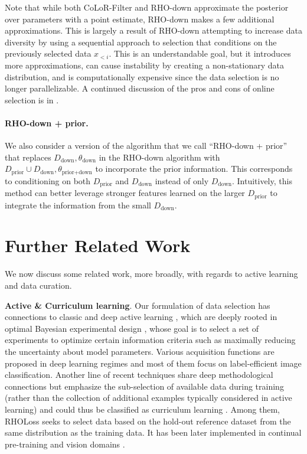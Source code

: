 \documentclass{article}
\newcommand{\Dprior}{D_{\text{prior}}}
\newcommand{\Ddown}{D_{\text{down}}}
\newcommand{\thetapriordown}{\theta_{\text{prior}+ \text{down}}}
\newcommand{\thetadown}{\theta_{\text{down}}}
\begin{document}
Note that while both CoLoR-Filter and RHO-down approximate the posterior over parameters with a point estimate, RHO-down makes a few additional approximations. This is largely a result of RHO-down attempting to increase data diversity by using a sequential approach to selection that conditions on the previously selected data $ x_{<i}$. This is an understandable goal, but it introduces more approximations, can cause instability by creating a non-stationary data distribution, and is computationally expensive since the data selection is no longer parallelizable.
A continued discussion of the pros and cons of online selection is in .

\paragraph{RHO-down + prior.} We also consider a version of the algorithm that we call ``RHO-down + prior'' that replaces $ \Ddown, \thetadown$ in the RHO-down algorithm with $ \Dprior \cup \Ddown , \thetapriordown$ to incorporate the prior information. This corresponds to conditioning on both $ \Dprior$ and $ \Ddown$ instead of only $ \Ddown$. Intuitively, this method can better leverage stronger features learned on the larger $ \Dprior$ to integrate the information from the small $ \Ddown$.

\section{Further Related Work}\label{sec:related}

We now discuss some related work, more broadly, with regards to active learning and data curation.

\textbf{Active \& Curriculum learning}. 
Our formulation of data selection has connections to classic and deep active learning \citep{houlsby2011bayesian, bickfordsmith2023prediction, kirsch2023a}, which are deeply rooted in optimal Bayesian experimental design \citep{lindley1956measure, rainforth2024modern}, whose goal is to select a set of experiments to optimize certain information criteria \citep{pukelsheim2006optimal} such as maximally reducing the uncertainty about model parameters. Various acquisition functions are proposed in deep learning regimes \citep{sener2018active, ash2019deep, ash2021gone} and most of them focus on label-efficient image classification.
Another line of recent techniques share deep methodological connections but emphasize the sub-selection of available data during training (rather than the collection of additional examples typically considered in active learning) and could thus be classified as curriculum learning \citep[e.g.][]{graves2017automated}. Among them, RHOLoss \citep{mindermann2022prioritized} seeks to select data based on the hold-out reference dataset from the same distribution as the training data. It has been later implemented in continual pre-training \citep{lin2024rho1} and vision domains \citep{evans2023bad, tack2024learning}. 
\end{document}

